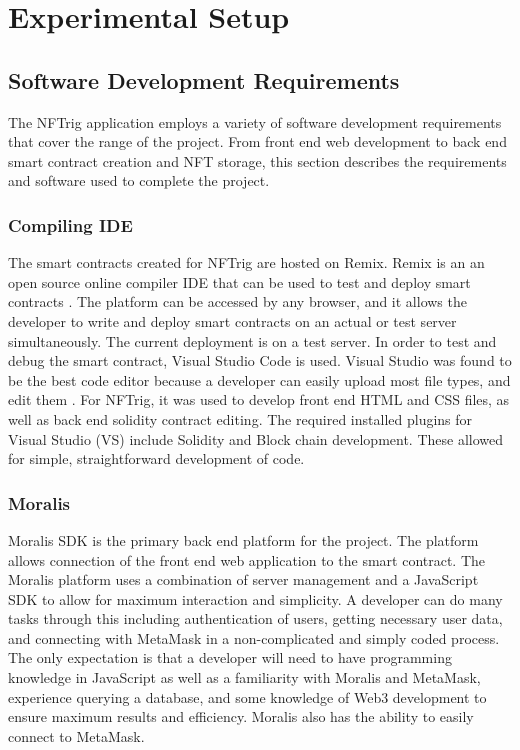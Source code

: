 \documentclass[acmsmall,nonacm]{acmart}
\begin{document}
\section{Experimental Setup}
\subsection{Software Development Requirements}
The NFTrig application employs a variety of software development requirements that cover the range of the project. From front end web development to back end smart contract creation and NFT storage, this section describes the requirements and software used to complete the project. 

\subsubsection{Compiling IDE}
The smart contracts created for NFTrig are hosted on Remix. Remix is an an open source online compiler IDE that can be used to test and deploy smart contracts \cite{amir2020remix}. The platform can be accessed by any browser, and it allows the developer to write and deploy smart contracts on an actual or test server simultaneously. The current deployment is on a test server. In order to  test and debug the smart contract, Visual Studio Code is used. Visual Studio was found to be the best code editor because a developer can easily upload most file types, and edit them \cite{johnson2012professional}. For NFTrig, it was used to develop front end HTML and CSS files, as well as back end solidity contract editing. The required installed plugins for Visual Studio (VS) include Solidity and Block chain development. \cite{9565983} These allowed for simple, straightforward development of code.

\subsubsection{Moralis}
Moralis SDK is the primary back end platform for the project. The platform allows connection of the front end web application to the smart contract. \cite{9202574} The Moralis platform uses a combination of server management and a JavaScript SDK to allow for maximum interaction and simplicity. A developer can do many tasks through this including authentication of users, getting necessary user data, and connecting with MetaMask in a non-complicated and simply coded process. The only expectation is that a developer will need to have programming knowledge in JavaScript as well as a familiarity with Moralis and MetaMask, experience querying a database, and some knowledge of Web3 development to ensure maximum results and efficiency. Moralis also has the ability to easily connect to MetaMask.
\end{document}

